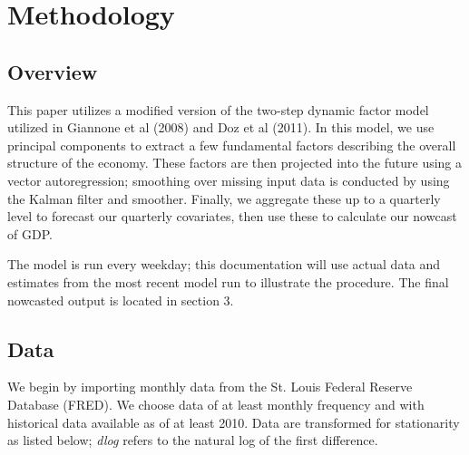 \documentclass[11pt, letterpaper]{article}\usepackage[]{graphicx}\usepackage[]{color}
\begin{document}
\section{Methodology}

\subsection{Overview}
This paper utilizes a modified version of the two-step dynamic factor model utilized in Giannone et al (2008) and Doz et al (2011). In this model, we use principal components to extract a few fundamental factors describing the overall structure of the economy. These factors are then projected into the future using a vector autoregression; smoothing over missing input data is conducted by using the Kalman filter and smoother. Finally, we aggregate these up to a quarterly level to forecast our quarterly covariates, then use these to calculate our nowcast of GDP.

The model is run every weekday; this documentation will use actual data and estimates from the most recent model run to illustrate the procedure. The final nowcasted output is located in section 3.


\subsection{Data}
We begin by importing monthly data from the St. Louis Federal Reserve Database (FRED). We choose data of at least monthly frequency and with historical data available as of at least 2010. Data are transformed for stationarity as listed below; \textit{dlog} refers to the natural log of the first difference.
\end{document}
